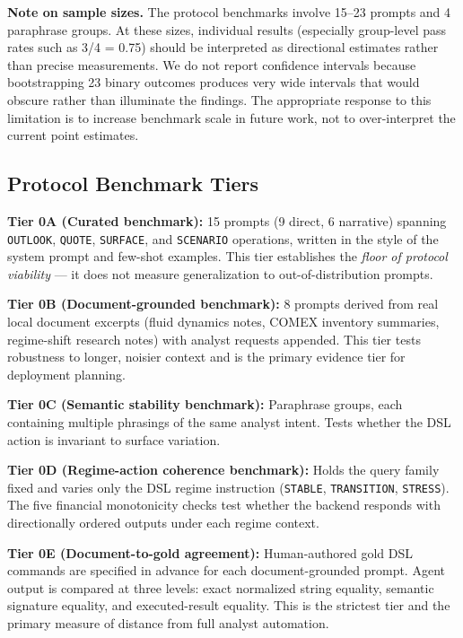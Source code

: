 \documentclass[11pt,a4paper]{article}
\begin{document}
\textbf{Note on sample sizes.} The protocol benchmarks involve 15--23 prompts and 4
paraphrase groups. At these sizes, individual results (especially group-level pass rates
such as 3/4 = 0.75) should be interpreted as directional estimates rather than precise
measurements. We do not report confidence intervals because bootstrapping 23 binary
outcomes produces very wide intervals that would obscure rather than illuminate the
findings. The appropriate response to this limitation is to increase benchmark scale
in future work, not to over-interpret the current point estimates.

\subsection{Protocol Benchmark Tiers}

\textbf{Tier 0A (Curated benchmark):} 15 prompts (9 direct, 6 narrative) spanning
\texttt{OUTLOOK}, \texttt{QUOTE}, \texttt{SURFACE}, and \texttt{SCENARIO} operations,
written in the style of the system prompt and few-shot examples. This tier establishes
the \emph{floor of protocol viability} --- it does not measure generalization to
out-of-distribution prompts.

\textbf{Tier 0B (Document-grounded benchmark):} 8 prompts derived from real local
document excerpts (fluid dynamics notes, COMEX inventory summaries, regime-shift
research notes) with analyst requests appended. This tier tests robustness to longer,
noisier context and is the primary evidence tier for deployment planning.

\textbf{Tier 0C (Semantic stability benchmark):} Paraphrase groups, each containing
multiple phrasings of the same analyst intent. Tests whether the DSL action is
invariant to surface variation.

\textbf{Tier 0D (Regime-action coherence benchmark):} Holds the query family fixed and
varies only the DSL regime instruction (\texttt{STABLE}, \texttt{TRANSITION},
\texttt{STRESS}). The five financial monotonicity checks test whether the backend
responds with directionally ordered outputs under each regime context.

\textbf{Tier 0E (Document-to-gold agreement):} Human-authored gold DSL commands are
specified in advance for each document-grounded prompt. Agent output is compared at
three levels: exact normalized string equality, semantic signature equality, and
executed-result equality. This is the strictest tier and the primary measure of
distance from full analyst automation.
\end{document}
